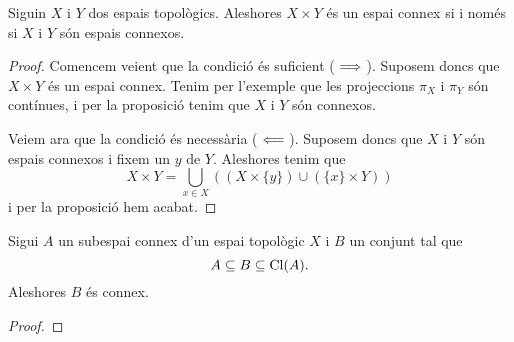 \documentclass[../Apunts.tex]{subfiles}
\begin{document}
	\begin{proposition}
		\label{prop:dos espais topològics són connexos si i només si el seu producte cartesià ho és}
		Siguin \(X\) i \(Y\) dos espais topològics. Aleshores \(X\times Y\) és un espai connex si i només si \(X\) i \(Y\) són espais connexos.
		\begin{proof}
			Comencem veient que la condició és suficient (\(\implies\)). Suposem doncs que \(X\times Y\) és un espai connex. Tenim per l'exemple  que les projeccions \(\pi_{X}\) i \(\pi_{Y}\) són contínues, i per la proposició  tenim que \(X\) i \(Y\) són connexos.
			
			Veiem ara que la condició és necessària (\(\impliedby\)). Suposem doncs que \(X\) i \(Y\) són espais connexos i fixem un \(y\) de \(Y\). Aleshores tenim que
			\[X\times Y=\bigcup_{x\in X}\left((X\times\{y\})\cup(\{x\}\times Y)\right)\]
			i per la proposició  hem acabat.
		\end{proof}
	\end{proposition}
	\begin{proposition}
		\label{prop:un conjunt inclós entre un connex i la seva clausura és connex}
		Sigui \(A\) un subespai connex d'un espai topològic \(X\) i \(B\) un conjunt tal que
		\[A\subseteq B\subseteq\operatorname{Cl}(A).\]
		Aleshores \(B\) és connex.
		\begin{proof}
		\end{proof}
	\end{proposition}
\end{document}

